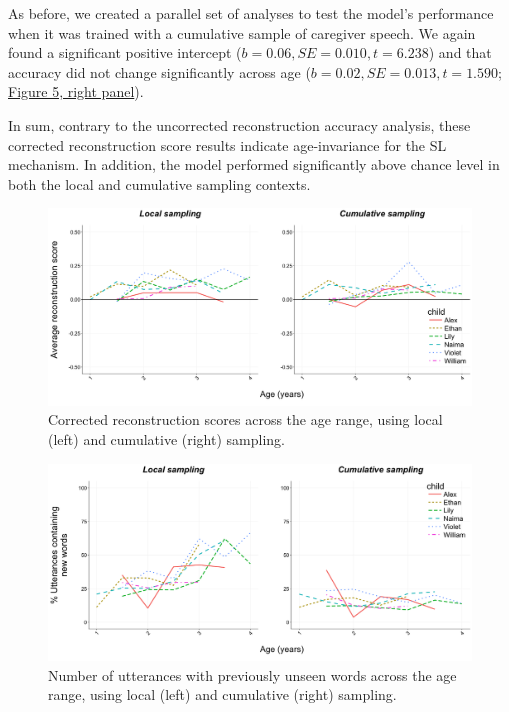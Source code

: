 \documentclass[man,mask,floatsintext]{apa6}
\begin{document}
As before, we created a parallel set of analyses to test the model's
performance when it was trained with a cumulative sample of caregiver
speech. We again found a significant positive intercept
(\(b= 0.06, SE = 0.010, t = 6.238\)) and that accuracy did not change
significantly across age (\(b=0.02, SE = 0.013, t = 1.590\);
\protect\hyperlink{fig5}{Figure 5, right panel}).

In sum, contrary to the uncorrected reconstruction accuracy analysis,
these corrected reconstruction score results indicate age-invariance for
the SL mechanism. In addition, the model performed significantly above
chance level in both the local and cumulative sampling contexts.

\begin{figure}

{\centering \includegraphics[width=0.95\linewidth]{images/plotbothreconstruction} 

}

\caption{Corrected reconstruction scores across the age range, using local (left) and cumulative (right) sampling.}\label{fig:fig5}
\end{figure}

\begin{figure}

{\centering \includegraphics[width=0.95\linewidth]{images/plotbothunknown} 

}

\caption{Number of utterances with previously unseen words across the age range, using local (left) and cumulative (right) sampling.}\label{fig:fig6}
\end{figure}
\end{document}
